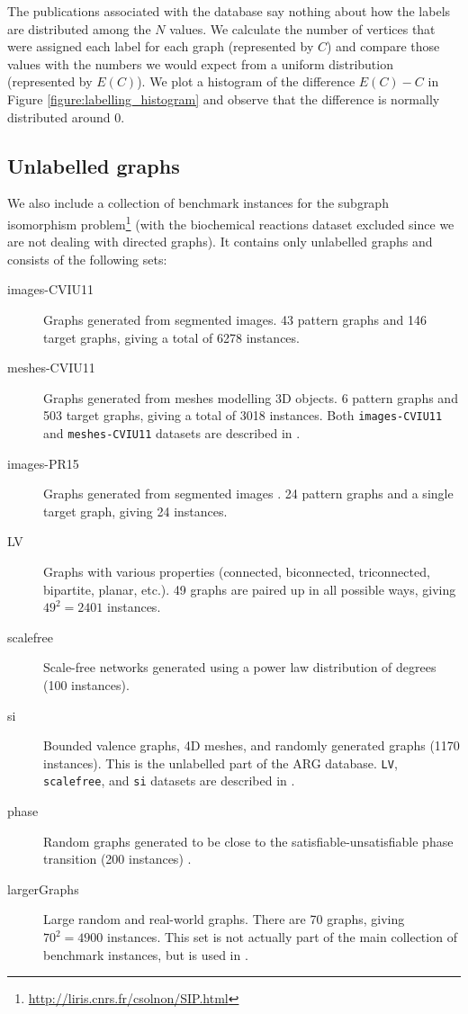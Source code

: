 \documentclass{article}
\theoremstyle{definition}
\theoremstyle{remark}
\begin{document}
The publications associated with the database \cite{foggia2001-2, DBLP:journals/prl/SantoFSV03}
say nothing about how the labels are distributed among the $N$ values. We
calculate the number of vertices that were assigned each label for each graph
(represented by $C$) and compare those values with the numbers we would expect
from a uniform distribution (represented by $E(C)$). We plot a histogram of the
difference $E(C) - C$ in Figure \ref{figure:labelling_histogram} and observe
that the difference is normally distributed around 0.

\subsection{Unlabelled graphs}
We also include a collection of benchmark instances for the subgraph isomorphism
problem\footnote{\url{http://liris.cnrs.fr/csolnon/SIP.html}} (with the
biochemical reactions dataset excluded since we are not dealing with directed
graphs). It contains only unlabelled graphs and consists of the following sets:

\begin{description}
\item[images-CVIU11] Graphs generated from segmented images. 43 pattern graphs
  and 146 target graphs, giving a total of 6278 instances.
\item[meshes-CVIU11] Graphs generated from meshes modelling 3D
  objects. 6 pattern graphs and 503 target graphs, giving a total of 3018
  instances. Both \texttt{images-CVIU11} and \texttt{meshes-CVIU11} datasets are
  described in \cite{DBLP:journals/cviu/DamiandSHJS11}.
\item[images-PR15] Graphs generated from segmented images
  \cite{DBLP:journals/pr/SolnonDHJ15}. 24 pattern graphs and a single target
  graph, giving 24 instances.
\item[LV] Graphs with various properties (connected, biconnected, triconnected,
  bipartite, planar, etc.). 49 graphs are paired up in all possible ways, giving
  $49^2=2401$ instances.
\item[scalefree] Scale-free networks generated using a power law distribution of
  degrees (100 instances).
\item[si] Bounded valence graphs, 4D meshes, and randomly generated graphs (1170
  instances). This is the unlabelled part of the ARG database. \texttt{LV},
  \texttt{scalefree}, and \texttt{si} datasets are described in
  \cite{DBLP:journals/ai/Solnon10, DBLP:journals/constraints/ZampelliDS10}.
\item[phase] Random graphs generated to be close to the
  satisfiable-unsatisfiable phase transition (200 instances)
  \cite{DBLP:conf/ijcai/McCreeshPT16}.
\item[largerGraphs] Large random and real-world graphs. There are 70 graphs,
  giving $70^2=4900$ instances. This set is not actually part of the main
  collection of benchmark instances, but is used in
  \cite{DBLP:conf/aaai/HoffmannMR17, DBLP:conf/lion/KotthoffMS16,
    DBLP:conf/ijcai/McCreeshPT17}.
\end{description}
\end{document}
